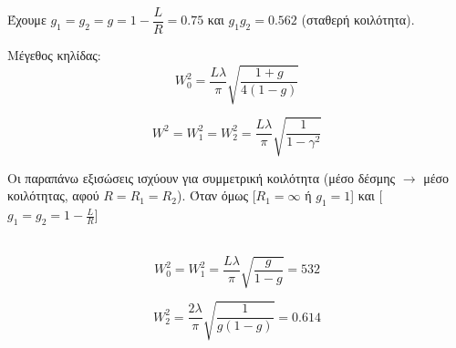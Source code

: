 \documentclass[a4paper,11pt,titlepage]{article}
\begin{document}
Έχουμε $g_1=g_2=g=1-\dfrac{L}{R}=0.75$ και $g_1g_2=0.562$ (σταθερή κοιλότητα).

Μέγεθος κηλίδας:
\begin{equation}
 W_0^2=\frac{L\lambda}{\pi}\sqrt{\dfrac{1+g}{4(1-g)}}
\end{equation}

\begin{equation}
 W^2=W_1^2=W_2^2=\frac{L\lambda}{\pi}\sqrt{\dfrac{1}{1-\gamma^2}}
\end{equation}

Οι παραπάνω εξισώσεις ισχύουν για συμμετρική κοιλότητα (μέσο δέσμης $\rightarrow$ μέσο κοιλότητας, αφού $R=R_1=R_2$). 
Όταν όμως [$R_1=\infty$ ή $g_1=1$] και [$g_1=g_2=1-\frac{L}{R}$]
\\\\
\begin{minipage}{0.5\linewidth} 
\begin{equation} 
 W_0^2=W_1^2=\frac{L\lambda}{\pi}\sqrt{\frac{g}{1-g}}=532
\end{equation} 
\end{minipage} 
\hspace{0.5cm} 
\begin{minipage}{0.5\linewidth} 
\begin{equation} 
 W_2^2=\frac{2\lambda}{\pi}\sqrt{\frac{1}{g(1-g)}}=0.614
\end{equation} 
\end{minipage}





\end{document}
